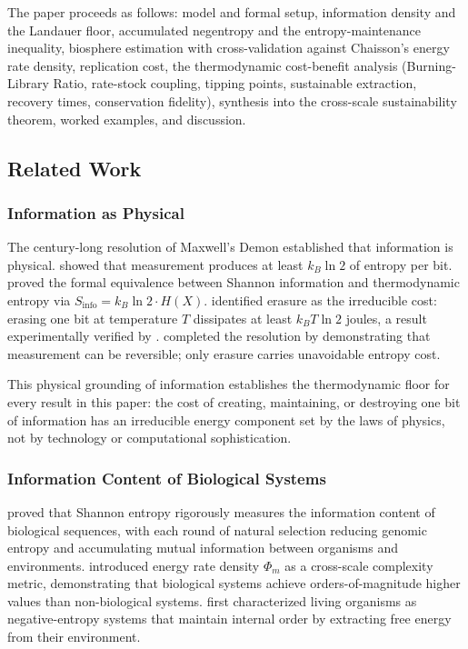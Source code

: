 \documentclass[11pt]{article}
\theoremstyle{plain}
\theoremstyle{definition}
\theoremstyle{remark}
\let\origsubsection\subsection
\renewcommand{\subsection}{\needspace{7\baselineskip}\origsubsection}
\let\origsubsubsection\subsubsection
\renewcommand{\subsubsection}{\needspace{4\baselineskip}\origsubsubsection}
\begin{document}
The paper proceeds as follows: model and formal setup, information
density and the Landauer floor, accumulated negentropy and the
entropy-maintenance inequality, biosphere estimation with
cross-validation against Chaisson's energy rate density, replication
cost, the thermodynamic cost-benefit analysis (Burning-Library Ratio,
rate-stock coupling, tipping points, sustainable extraction, recovery
times, conservation fidelity), synthesis into the cross-scale
sustainability theorem, worked examples, and discussion.

\subsection{Related Work}\label{related-work}

\subsubsection{Information as Physical}\label{information-as-physical}

The century-long resolution of Maxwell's Demon established that
information is physical. \citet{Szilard1929} showed that measurement
produces at least \(k_B \ln 2\) of entropy per bit.
\citeauthor{Brillouin1951}
\citetext{\citeyear{Brillouin1951}; \citeyear{Brillouin1962}} proved the
formal equivalence between Shannon information and thermodynamic entropy
via \(S_{\text{info}} = k_B \ln 2 \cdot H(X)\). \citet{Landauer1961}
identified erasure as the irreducible cost: erasing one bit at
temperature \(T\) dissipates at least \(k_B T \ln 2\) joules, a result
experimentally verified by \citet{Berut2012}. \citeauthor{Bennett1973}
\citetext{\citeyear{Bennett1973}; \citeyear{Bennett1982}} completed the
resolution by demonstrating that measurement can be reversible; only
erasure carries unavoidable entropy cost.

This physical grounding of information establishes the thermodynamic
floor for every result in this paper: the cost of creating, maintaining,
or destroying one bit of information has an irreducible energy component
set by the laws of physics, not by technology or computational
sophistication.

\subsubsection{Information Content of Biological
Systems}\label{information-content-of-biological-systems}

\citet{Adami2004} proved that Shannon entropy rigorously measures the
information content of biological sequences, with each round of natural
selection reducing genomic entropy and accumulating mutual information
between organisms and environments. \citet{Chaisson2011} introduced
energy rate density \(\Phi_m\) as a cross-scale complexity metric,
demonstrating that biological systems achieve orders-of-magnitude higher
values than non-biological systems. \citet{Schrodinger1944} first
characterized living organisms as negative-entropy systems that maintain
internal order by extracting free energy from their environment.
\end{document}
